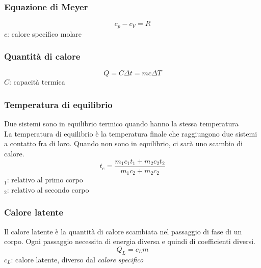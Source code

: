 \subsubsection{Equazione di Meyer}
\begin{equation*}
  c_p - c_V = R
\end{equation*}
$c$: calore specifico molare

\subsubsection{Quantità di calore}
\begin{equation*}
  Q = C\Delta t = mc\Delta T
\end{equation*}
$C$: capacità termica

\subsubsection{Temperatura di equilibrio}
Due sistemi sono in equilibrio termico quando hanno la stessa temperatura\\
La temperatura di equilibrio è la temperatura finale che raggiungono due sistemi a contatto fra di 
loro. Quando non sono in equilibrio, ci sarà uno scambio di calore.
\begin{equation*}
  t_e = \frac{m_1c_1t_1 + m_2c_2t_2}{m_1c_2 + m_2c_2}
\end{equation*}
$_1$: relativo al primo corpo\\
$_2$: relativo al secondo corpo

\subsubsection{Calore latente}
Il calore latente è la quantità di calore scambiata nel passaggio di fase di un corpo. Ogni 
passaggio necessita di energia diversa e quindi di coefficienti diversi.
\begin{equation*}
  Q_L = c_Lm
\end{equation*}
$c_L$: calore latente, diverso dal \emph{calore specifico}

